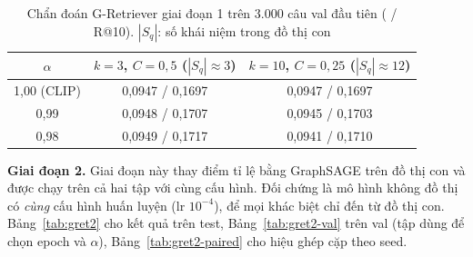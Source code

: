 \begin{table}[t]
\centering
\caption{Chẩn đoán G-Retriever giai đoạn 1 trên 3.000 câu val đầu tiên (\mrr{} / R@10). $|S_q|$: số khái niệm trong đồ thị con}
\label{tab:gret-diag}
\scriptsize
\setlength{\tabcolsep}{3pt}
\begin{tabular}{@{}c c c@{}}
\toprule
$\alpha$ & $k=3$, $C=0,5$ ($|S_q|\approx 3$) & $k=10$, $C=0,25$ ($|S_q|\approx 12$) \\
\midrule
1,00 (CLIP) & 0,0947 / 0,1697 & 0,0947 / 0,1697 \\
0,99 & 0,0948 / 0,1707 & 0,0945 / 0,1703 \\
0,98 & 0,0949 / 0,1717 & 0,0941 / 0,1710 \\
\bottomrule
\end{tabular}
\end{table}

\textbf{Giai đoạn 2.} Giai đoạn này thay điểm tỉ lệ bằng GraphSAGE trên đồ thị con và được chạy trên cả hai tập với cùng cấu hình. Đối chứng là mô hình không đồ thị có \emph{cùng} cấu hình huấn luyện (lr $10^{-4}$), để mọi khác biệt chỉ đến từ đồ thị con. Bảng~\ref{tab:gret2} cho kết quả trên test, Bảng~\ref{tab:gret2-val} trên val (tập dùng để chọn epoch và $\alpha$), Bảng~\ref{tab:gret2-paired} cho hiệu ghép cặp theo seed.

\begin{table}[t]
\centering
\caption{G-Retriever giai đoạn 2 trên test (5.000 ảnh, 25.000 truy vấn mỗi tập, 3 seed). Đối chứng: không đồ thị, cùng cấu hình huấn luyện (lr $10^{-4}$). Không so số tuyệt đối giữa hai tập}
\label{tab:gret2}
\scriptsize
\setlength{\tabcolsep}{1.5pt}
\end{table}

